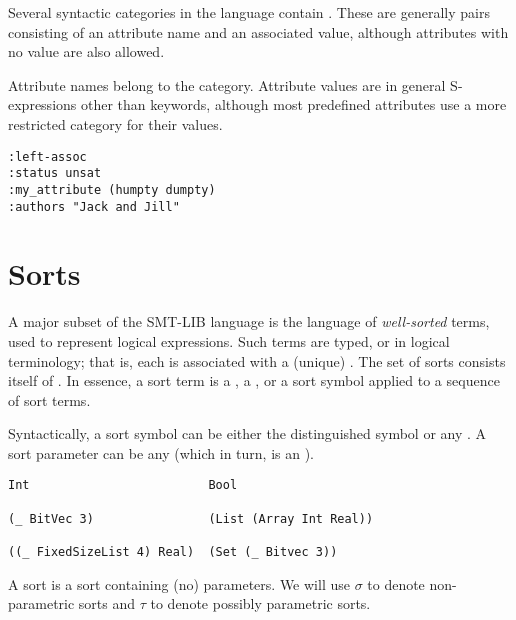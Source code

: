Several syntactic categories in the language contain .
These are generally pairs consisting of an attribute name and an associated value,
although attributes with no value are also allowed.

Attribute names belong to the  category. 
Attribute values are in general S-expressions other than keywords,
although most predefined attributes use a more restricted category for 
their values.
\bigskip

\cAttributes
\bigskip

\begin{lstlisting}[linewidth=21em]
:left-assoc      
:status unsat
:my_attribute (humpty dumpty)
:authors "Jack and Jill"
\end{lstlisting}



\section{Sorts} \label{sec:concrete-sorts}

A major subset of the SMT-LIB language is 
the language of \emph{well-sorted} terms,
used to represent logical expressions.
Such terms are typed, or  in logical terminology; 
that is, each is associated with a (unique) .
The set of sorts consists itself of .
In essence, a sort term is 
a ,
a , 
or a sort symbol applied to a sequence of sort terms.

Syntactically, a sort symbol can be either the distinguished symbol 
or any . 
A sort parameter can be any  
(which in turn, is an ).
\bigskip


\cSorts
\medskip

\begin{lstlisting}[linewidth=35em]
Int                         Bool

(_ BitVec 3)                (List (Array Int Real))

((_ FixedSizeList 4) Real)  (Set (_ Bitvec 3))       
\end{lstlisting}

A  sort is a sort containing (no) parameters.
We will use $\sigma$ to denote non-parametric sorts and 
$\tau$ to denote possibly parametric sorts.


